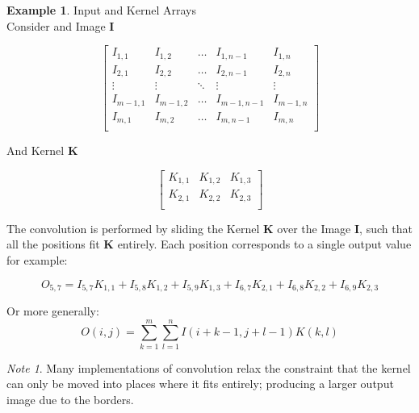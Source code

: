 \documentclass{article}
\theoremstyle{definition}
\newtheorem{ex}{Example}[subsection]
\theoremstyle{remark}
\newtheorem*{nb}{Note}
\begin{document}
\begin{ex} Input and Kernel Arrays\\

\noindent Consider and Image $ \pmb{I} $

\begin{equation*}
    \begin{bmatrix}
    I_{1, 1} & I_{1, 2} & \dots & I_{1, n-1} & I_{1, n} \\
    I_{2, 1} & I_{2, 2} & \dots & I_{2, n-1} & I_{2, n} \\
    \vdots & \vdots & \ddots & \vdots & \vdots \\ 
    I_{m-1, 1} & I_{m-1, 2} & \dots & I_{m-1, n-1} & I_{m-1, n} \\
    I_{m, 1} & I_{m, 2} & \dots & I_{m, n-1} & I_{m, n} \\
    \end{bmatrix}
\end{equation*}

\hfill

\noindent And Kernel $ \pmb{K} $

\begin{equation*}
    \begin{bmatrix}
	K_{1,1} & K_{1,2} & K_{1,3} \\
	K_{2,1} & K_{2,2} & K_{2,3} \\
    \end{bmatrix}
\end{equation*}

\hfill

\noindent The convolution is performed by sliding the Kernel $ \pmb{K} $ over the Image $ \pmb{I} $, such that all the positions fit $ \pmb{K} $ entirely. Each position corresponds to a single output value for example:

\begin{equation*}
    O_{5, 7} = I_{5, 7}K_{1,1} + I_{5, 8}K_{1,2} + I_{5, 9}K_{1,3} + I_{6, 7}K_{2,1} + I_{6, 8}K_{2,2} + I_{6, 9}K_{2,3}
\end{equation*}

\hfill

\noindent Or more generally:\\
\begin{equation}
O(i,j) = \sum_{k=1}^{m}\sum_{l=1}^{n}I(i + k - 1, j + l - 1)K(k, l)
\end{equation}

\end{ex}

\begin{nb}
    Many implementations of convolution relax the constraint that the kernel can only be moved into places where it fits entirely; producing a larger output image due to the borders.
\end{nb}
\end{document}
